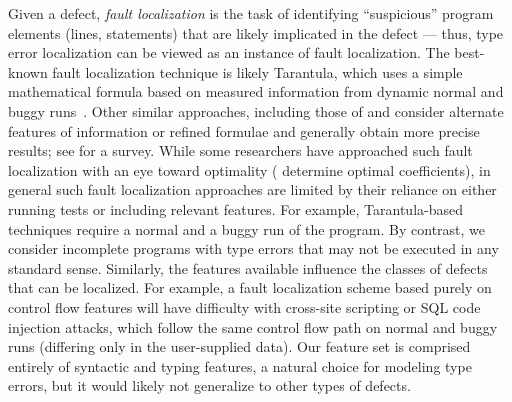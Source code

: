 %
Given a defect, \emph{fault localization} is the task of identifying
``suspicious'' program elements (\eg lines, statements) that are likely
implicated in the defect %
%
--- thus, type error localization can be viewed as an instance of fault
localization.
%
The best-known fault localization technique is likely Tarantula, which
uses a simple mathematical formula based on measured information from
dynamic normal and buggy runs~\citep{Jones2002-us}.
%
Other similar approaches, including those of \citet{Chen2002-qz} and
\citet{Abreu2006-fn,Abreu2007-mu} consider alternate features of
information or refined formulae and generally obtain more precise
results; see \citet{Wong2009-pd} for a survey.
%
While some researchers have approached such fault localization with an
eye toward optimality (\eg \citet{Yoo2013-rw} determine optimal
coefficients), in general such fault localization approaches are limited
by their reliance on either running tests or including relevant
features.
%
For example, Tarantula-based techniques require a normal and a buggy run
of the program.
%
By contrast, we consider incomplete programs with type errors that may
not be executed in any standard sense.
%
Similarly, the features available influence the classes of defects that
can be localized.
%
For example, a fault localization scheme based purely on control flow features
will have difficulty with cross-site scripting or SQL code injection
attacks, which follow the same control flow path on normal and buggy
runs (differing only in the user-supplied data).
%
Our feature set is comprised entirely of syntactic and typing features,
a natural choice for modeling type errors, but it would likely not
generalize to other types of defects.





